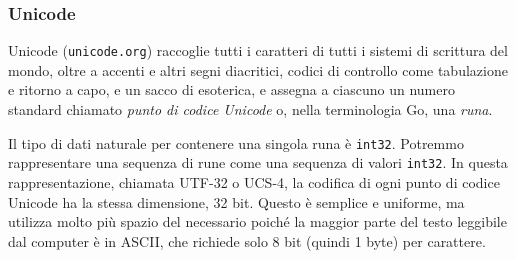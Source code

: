 \documentclass[../../../thesis.tex]{subfiles}
\begin{document}
    \subsubsection{Unicode}
    Unicode (\verb"unicode.org") raccoglie tutti i caratteri di tutti i sistemi di scrittura del mondo, oltre a accenti e altri segni diacritici, codici di controllo come tabulazione e ritorno a capo, e un sacco di esoterica, e assegna a ciascuno un numero standard chiamato \textit{punto di codice Unicode} o, nella terminologia Go, una \textit{runa}.
    \hfill \vspace{12pt}

    Il tipo di dati naturale per contenere una singola runa è \verb|int32|.
    Potremmo rappresentare una sequenza di rune come una sequenza di valori \verb"int32".
    In questa rappresentazione, chiamata UTF-32 o UCS-4, la codifica di ogni punto di codice Unicode ha la stessa dimensione, 32 bit.
    Questo è semplice e uniforme, ma utilizza molto più spazio del necessario poiché la maggior parte del testo leggibile dal computer è in ASCII, che richiede solo 8 bit (quindi 1 byte) per carattere.
\end{document}

